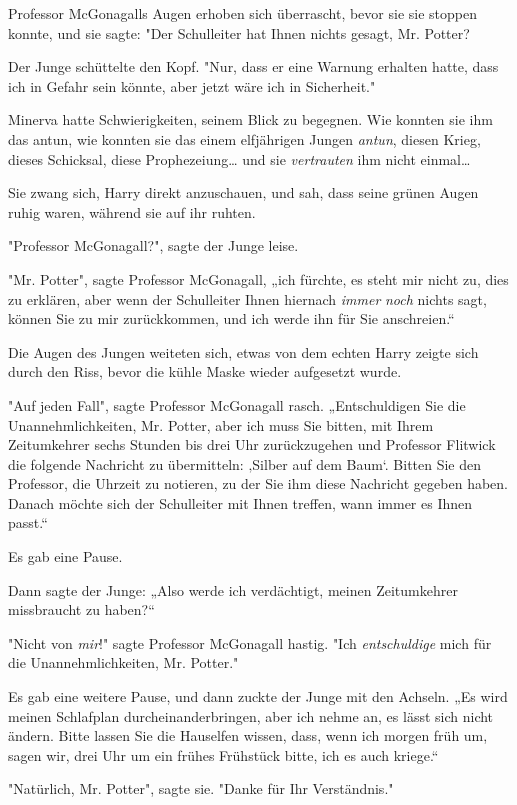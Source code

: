{Professor McGonagalls Augen erhoben sich überrascht, bevor sie sie stoppen konnte, und sie sagte: "Der Schulleiter hat Ihnen nichts gesagt, Mr. Potter?

Der Junge schüttelte den Kopf. "Nur, dass er eine Warnung erhalten hatte, dass ich in Gefahr sein könnte, aber jetzt wäre ich in Sicherheit."

Minerva hatte Schwierigkeiten, seinem Blick zu begegnen. Wie konnten sie ihm das antun, wie konnten sie das einem elfjährigen Jungen \emph{antun}, diesen Krieg, dieses Schicksal, diese Prophezeiung… und sie \emph{vertrauten} ihm nicht einmal…

Sie zwang sich, Harry direkt anzuschauen, und sah, dass seine grünen Augen ruhig waren, während sie auf ihr ruhten.

"Professor McGonagall?", sagte der Junge leise.

"Mr. Potter", sagte Professor McGonagall, „ich fürchte, es steht mir nicht zu, dies zu erklären, aber wenn der Schulleiter Ihnen hiernach \emph{immer} \emph{noch} nichts sagt, können Sie zu mir zurückkommen, und ich werde ihn für Sie anschreien.“

Die Augen des Jungen weiteten sich, etwas von dem echten Harry zeigte sich durch den Riss, bevor die kühle Maske wieder aufgesetzt wurde.

"Auf jeden Fall", sagte Professor McGonagall rasch. „Entschuldigen Sie die Unannehmlichkeiten, Mr. Potter, aber ich muss Sie bitten, mit Ihrem Zeitumkehrer sechs Stunden bis drei Uhr zurückzugehen und Professor Flitwick die folgende Nachricht zu übermitteln: ‚Silber auf dem Baum`. Bitten Sie den Professor, die Uhrzeit zu notieren, zu der Sie ihm diese Nachricht gegeben haben. Danach möchte sich der Schulleiter mit Ihnen treffen, wann immer es Ihnen passt.“

Es gab eine Pause.

Dann sagte der Junge: „Also werde ich verdächtigt, meinen Zeitumkehrer missbraucht zu haben?“

"Nicht von \emph{mir}!" sagte Professor McGonagall hastig. "Ich \emph{entschuldige} mich für die Unannehmlichkeiten, Mr. Potter."

Es gab eine weitere Pause, und dann zuckte der Junge mit den Achseln. „Es wird meinen Schlafplan durcheinanderbringen, aber ich nehme an, es lässt sich nicht ändern. Bitte lassen Sie die Hauselfen wissen, dass, wenn ich morgen früh um, sagen wir, drei Uhr um ein frühes Frühstück bitte, ich es auch kriege.“

"Natürlich, Mr. Potter", sagte sie. "Danke für Ihr Verständnis."

}
